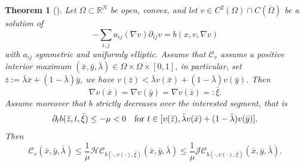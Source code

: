 \documentclass[11pt, reqno]{amsart}
\newtheorem{theorem}[lemma]{Theorem}
\theoremstyle{definition}
\numberwithin{equation}{section}
\newcommand{\R}{\mathbb{R}}
\newcommand{\mc}[1]{\mathcal{#1}}
\begin{document}
\begin{theorem}[\cite{BuSq20}]
\label{thm_approx_concav_bucsquas}
Let $\Omega \subset \R^N$ be open, convex, and let $v \in C^2(\Omega) \cap C(\overline{\Omega})$ be a solution of 
$$-\sum_{i,j} a_{ij}(\nabla v) \partial_{ij} v = b(x,v,\nabla v)$$
with $a_{ij}$ symmetric and uniformly elliptic. 
Assume that $\mc{C}_v$ assume a positive interior maximum $(\bar{x},\bar{y},\bar{\lambda}) \in \Omega \times \Omega \times [0,1]$, in particular, set $\bar{z}:=\bar{\lambda} \bar{x} + (1-\bar{\lambda})\bar{y}$, we have $v(\bar{z}) < \bar{\lambda} v(\bar{x}) + (1-\bar{\lambda}) v(\bar{y}).$ 
Then 
$$\nabla v(\bar{x})=\nabla v(\bar{y}) =\nabla v(\bar{z})=:\bar{\xi}.$$
Assume moreover that $b$ strictly decreases over the interested segment, that is
$$\partial_t b(\bar{z}, t, \bar{\xi}) \leq -\mu <0 \quad \hbox{for $t \in [v(\bar{z}), \bar{\lambda} v(\bar{x}) + (1-\bar{\lambda})v(\bar{y})]$}.$$
Then
$$\mc{C}_v(\bar{x},\bar{y},\bar{\lambda}) \leq \frac{1}{\mu} \mc{HC}_{b(\cdot, v(\cdot), \bar{\xi})}(\bar{x},\bar{y},\bar{\lambda}) 
 \leq \frac{1}{\mu} \mc{JC}_{b(\cdot, v(\cdot), \bar{\xi})} (\bar{x},\bar{y},\bar{\lambda}).$$
\end{theorem}
\end{document}
